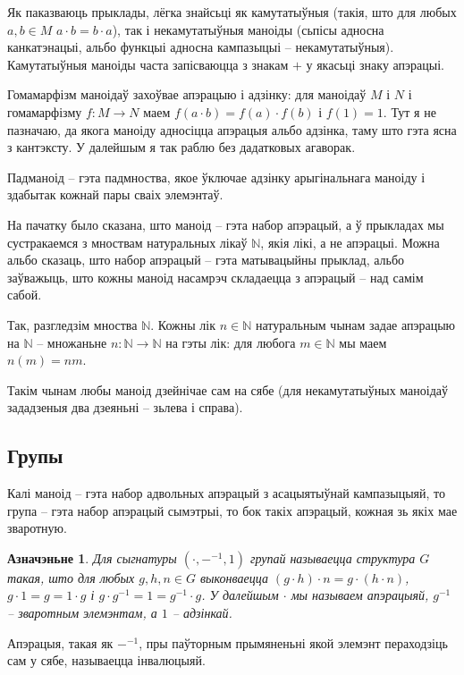 \documentclass[a4paper,12pt]{book}
\newtheorem{definition}{Азначэньне}[section]
\begin{document}
Як паказваюць прыклады, лёгка знайсьці як камутатыўныя (такія, што для
любых $a, b \in M$ $a \cdot b = b \cdot a$), так і некамутатыўныя
маноіды (сьпісы адносна канкатэнацыі, альбо функцыі адносна кампазыцыі
-- некамутатыўныя). Камутатыўныя маноіды часта запісваюцца з знакам
$+$ у якасьці знаку апэрацыі.

Гомамарфізм маноідаў захоўвае апэрацыю і адзінку: для маноідаў $M$ і
$N$ і гомамарфізму $f:M \rightarrow N$ маем $f(a \cdot b) = f(a) \cdot
f(b)$ і $f(1) = 1$. Тут я не пазначаю, да якога маноіду адносіцца
апэрацыя альбо адзінка, таму што гэта ясна з кантэксту. У далейшым я
так раблю без дадатковых агаворак.

Падманоід -- гэта падмноства, якое ўключае адзінку арыгінальнага
маноіду і здабытак кожнай пары сваіх элемэнтаў.

На пачатку было сказана, што маноід -- гэта набор апэрацый, а ў
прыкладах мы сустракаемся з мноствам натуральных лікаў $\mathbb{N}$,
якія лікі, а не апэрацыі. Можна альбо сказаць, што набор апэрацый --
гэта матывацыйны прыклад, альбо заўважыць, што кожны маноід насамрэч
складаецца з апэрацый -- над самім сабой.

Так, разгледзім мноства $\mathbb{N}$. Кожны лік $n \in \mathbb{N}$
натуральным чынам задае апэрацыю на $\mathbb{N}$ -- множаньне $n:
\mathbb{N} \rightarrow \mathbb{N}$ на гэты
лік: для любога $m \in \mathbb{N}$ мы маем $n(m) = nm$.

Такім чынам любы маноід дзейнічае сам на сябе (для некамутатыўных
маноідаў зададзеныя два дзеяньні -- зьлева і справа).

\subsection{Групы}

Калі маноід -- гэта набор адвольных апэрацый з асацыятыўнай
кампазыцыяй, то група -- гэта набор апэрацый сымэтрыі, то бок такіх
апэрацый, кожная зь якіх мае зваротную.

\begin{definition}
  Для сыгнатуры $(\cdot, -^{-1}, 1)$ групай называецца структура $G$
  такая, што для любых $g, h, n \in G$ выконваецца $(g \cdot h) \cdot n = g
  \cdot (h \cdot n)$, $g \cdot 1 = g = 1 \cdot g$ і $g \cdot g^{-1} =
  1 = g^{-1} \cdot g$. У далейшым $\cdot$ мы называем апэрацыяй,
  $g^{-1}$ -- зваротным элемэнтам, а $1$ -- адзінкай.
\end{definition}

Апэрацыя, такая як $-^{-1}$, пры паўторным прымяненьні якой элемэнт
пераходзіць сам у сябе, называецца інвалюцыяй.
\end{document}
